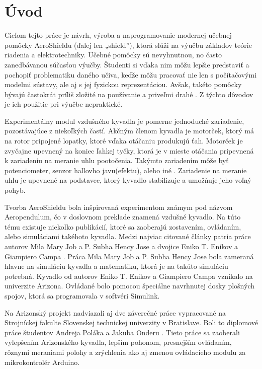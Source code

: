 \chapter*{Úvod}
\label{UVOD}

Cieľom tejto práce je návrh, výroba a naprogramovanie modernej učebnej pomôcky AeroShieldu (ďalej len „shield”), ktorá slúži na výučbu základov teórie riadenia a elektrotechniky. Učebné pomôcky sú nevyhnutnou, no často zanedbávanou súčasťou výučby. Študenti si vďaka nim môžu lepšie predstaviť a pochopiť problematiku daného učiva, keďže môžu pracovať nie len s počítačovými modelmi sústavy, ale aj s jej fyzickou reprezentáciou. Avšak, takéto pomôcky bývajú častokrát príliš zložité na používanie a priveľmi drahé \cite{Hor}. Z týchto dôvodov je ich použitie pri výučbe nepraktické.
 
Experimentálny modul vzdušného kyvadla je pomerne jednoduché zariadenie, pozostávajúce z niekoľkých častí. Akčným členom kyvadla je motorček, ktorý má na rotor pripojené lopatky, ktoré vďaka otáčaniu produkujú ťah. Motorček je zvyčajne upevnený na koniec ľahkej tyčky, ktorá je v mieste otáčania pripevnená k zariadeniu na meranie uhlu pootočenia. Takýmto zariadením môže byť potenciometer, senzor hallovho javu(efektu), alebo iné \cite{senzor}. Zariadenie na meranie uhlu je upevnené na podstavec, ktorý kyvadlo stabilizuje a umožňuje jeho voľný pohyb. 
 
Tvorba AeroShieldu bola inšpirovaná experimentom známym pod názvom Aeropendulum, čo v doslovnom preklade znamená vzdušné kyvadlo. Na túto tému existuje niekoľko publikácií, ktoré sa zaoberajú zostavením, ovládaním, alebo simuláciami takéhoto kyvadla. Medzi najviac citované články patria práce autorov Mila Mary Job a P. Subha Hency Jose \cite{7192959} a dvojice Eniko T. Enikov a Giampiero Campa \cite{enikov_campa_2012}. Práca Mila Mary Job a P. Subha Hency Jose bola zameraná hlavne na simuláciu kyvadla a matematiku, ktorá je na takúto simuláciu potrebná. Kyvadlo od autorov Eniko T. Enikov a Giampiero Campa vznikalo na univerzite Arizona. Ovládané bolo pomocou špeciálne navrhnutej dosky plošných spojov, ktorá sa programovala v softvéri Simulink. 

Na Arizonský projekt nadviazali aj dve záverečné práce vypracované na Strojníckej fakulte Slovenskej technickej univerzity v Bratislave. Boli to diplomové práce študentov Andreja Poláka \cite{Polakk} a Jakuba Onderu \cite{onderkaaa}. Tieto práce sa zaoberali vylepšením Arizonského kyvadla, lepším pohonom, presnejším ovládaním, rôznymi meraniami polohy a zrýchlenia ako aj zmenou ovládacieho modulu za mikrokontrolér Arduino.

